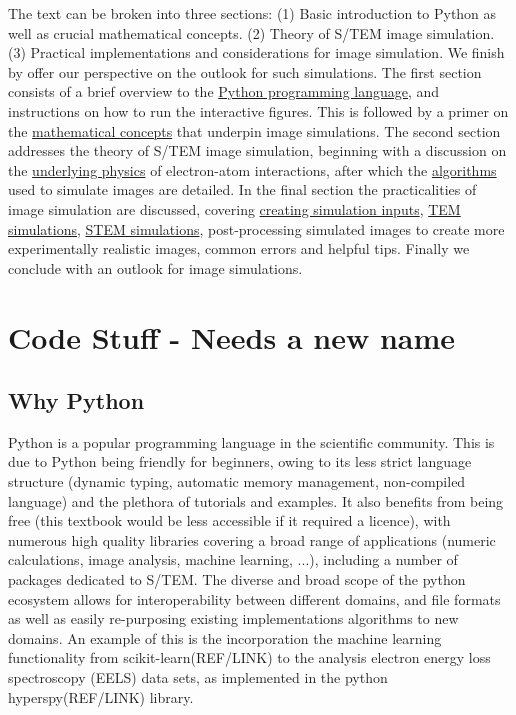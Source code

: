 \documentclass[%
 superscriptaddress,
 aip,
 amsmath,amssymb,
preprint,%
 author-year,%
longbibliography
]{revtex4-2}
\begin{document}
The text can be broken into three sections: (1) Basic introduction to Python as well as crucial mathematical concepts. (2) Theory of S/TEM image simulation. (3) Practical implementations and considerations for image simulation. We finish by offer our perspective on the outlook for such simulations. The first section consists of a brief overview to the \href{code_stuff}{Python programming language}, and instructions on how to run the interactive figures. This is followed by a primer on the \href{math_stuff}{mathematical concepts} that underpin image simulations. The second section addresses the theory of S/TEM image simulation, beginning with a discussion on the \href{physics_stuff}{underlying physics} of electron-atom interactions, after which the \href{electron_scatter}{algorithms} used to simulate images are detailed. In the final section the practicalities of image simulation are discussed, covering \href{sim_inputs}{creating simulation inputs}, \href{TEM_SIMS}{TEM simulations}, \href{STEM_SIMS}{STEM simulations}, post-processing simulated images to create more experimentally realistic images, common errors and helpful tips. Finally we conclude with an outlook for image simulations.


\section*{Code Stuff - Needs a new name}\label{code_stuff}

\subsection*{Why Python}
Python is a popular programming language in the scientific community. This is due to Python being friendly for beginners, owing to its less strict language structure (dynamic typing, automatic memory management, non-compiled language) and the plethora of tutorials and examples. It also benefits from being free (this textbook would be less accessible if it required a licence), with numerous high quality libraries covering a broad range of applications (numeric calculations, image analysis, machine learning, ...), including a number of packages dedicated to S/TEM. The diverse and broad scope of the python ecosystem allows for interoperability between different domains, and file formats as well as easily re-purposing existing implementations algorithms to new domains. An example of this is the incorporation the machine learning functionality from scikit-learn(REF/LINK) to the analysis electron energy loss spectroscopy (EELS) data sets, as implemented in the python hyperspy(REF/LINK) library.
\end{document}
